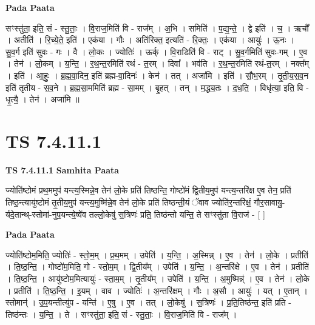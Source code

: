 \documentclass[17pt]{extarticle}
\begin{document}
\textbf{Pada Paata} \newline

सꣳस्तु॑ता॒ इति॒ सं - स्तु॒ताः॒ । वि॒राज॒मिति॑ वि - राज᳚म् । अ॒भि । समिति॑ । प॒द्य॒न्ते॒ । द्वे इति॑ । च॒ । ऋचौ᳚ । अतीति॑ । रि॒च्ये॒ते॒ इति॑ । एक॑या । गौः । अति॑रिक्त॒ इत्यति॑ - रि॒क्तः॒ । एक॑या । आयुः॑ । ऊ॒नः । सु॒व॒र्ग इति॑ सुवः - गः । वै । लो॒कः । ज्योतिः॑ । ऊर्क् । वि॒राडिति॑ वि - राट् । सु॒व॒र्गमिति॑ सुवः-गम् । ए॒व । तेन॑ । लो॒कम् । य॒न्ति॒ । र॒थ॒न्त॒रमिति॑ रथं - त॒रम् । दिवा᳚ । भव॑ति । र॒थ॒न्त॒रमिति॑ रथं-त॒रम् । नक्त᳚म् । इति॑ । आ॒हुः॒ । ब्र॒ह्म॒वा॒दिन॒ इति॑ ब्रह्म-वा॒दिनः॑ । केन॑ । तत् । अजा॑मि । इति॑ । सौ॒भ॒रम् । तृ॒ती॒य॒स॒व॒न इति॑ तृतीय - स॒व॒ने । ब्र॒ह्म॒सा॒ममिति॑ ब्रह्म - सा॒मम् । बृ॒हत् । तन् । म॒द्ध्य॒तः । द॒ध॒ति॒ । विधृ॑त्या॒ इति॒ वि - धृ॒त्यै॒ । तेन॑ । अजा॑मि ॥  \newline





\section{ TS 7.4.11.1 }

\textbf{TS 7.4.11.1 } \newline
\textbf{Samhita Paata} \newline

ज्योति॑ष्टोमं प्रथ॒ममुप॑ यन्त्य॒स्मिन्ने॒व तेन॑ लो॒के प्रति॑ तिष्ठन्ति॒ गोष्टो॑मं द्वि॒तीय॒मुप॑ यन्त्य॒न्तरि॑क्ष ए॒व तेन॒ प्रति॑ तिष्ठ॒न्त्यायु॑ष्टोमं तृ॒तीय॒मुप॑ यन्त्य॒मुष्मि॑न्ने॒व तेन॑ लो॒के प्रति॑ तिष्ठन्ती॒यं ॅवाव ज्योति॑र॒न्तरि॑क्षं॒ गौर॒सावायु॒-र्यदे॒तान्थ्-स्तोमा॑-नुप॒यन्त्ये॒ष्वे॑व तल्लो॒केषु॑ स॒त्रिणः॑ प्रति॒ तिष्ठ॑न्तो यन्ति॒ ते सꣳस्तु॑ता वि॒राज॑ - [  ] \newline

\textbf{Pada Paata} \newline

ज्योति॑ष्टोम॒मिति॒ ज्योतिः॑ - स्तो॒म॒म् । प्र॒थ॒मम् । उपेति॑ । य॒न्ति॒ । अ॒स्मिन्न् । ए॒व । तेन॑ । लो॒के । प्रतीति॑ । ति॒ष्ठ॒न्ति॒ । गोष्टो॑म॒मिति॒ गो - स्तो॒म॒म् । द्वि॒तीय᳚म् । उपेति॑ । य॒न्ति॒ । अ॒न्तरि॑क्षे । ए॒व । तेन॑ । प्रतीति॑ । ति॒ष्ठ॒न्ति॒ । आयु॑ष्टोम॒मित्यायुः॑ - स्ता॒म॒म् । तृ॒तीय᳚म् । उपेति॑ । य॒न्ति॒ । अ॒मुष्मिन्न्॑ । ए॒व । तेन॑ । लो॒के । प्रतीति॑ । ति॒ष्ठ॒न्ति॒ । इ॒यम् । वाव । ज्योतिः॑ । अ॒न्तरि॑क्षम् । गौः । अ॒सौ । आयुः॑ । यत् । ए॒तान् । स्तोमान्॑ । उ॒प॒यन्तीत्यु॑प - यन्ति॑ । ए॒षु । ए॒व । तत् । लो॒केषु॑ । स॒त्रिणः॑ । प्र॒ति॒तिष्ठ॑न्त॒ इति॑ प्रति - तिष्ठ॑न्तः । य॒न्ति॒ । ते । सꣳस्तु॑ता॒ इति॒ सं - स्तु॒ताः॒ । वि॒राज॒मिति॑ वि - राज᳚म् ।  \newline
\end{document}

